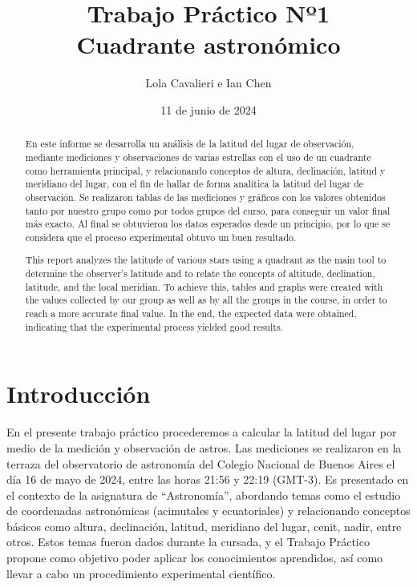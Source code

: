 \documentclass[12pt, a4paper]{article} %
\title{Trabajo Práctico Nº1 \\ Cuadrante astronómico}
\author{Lola Cavalieri e Ian Chen}
\date{11 de junio de 2024}
\begin{document}
\maketitle

\vspace{1cm}
\begin{abstract}
    En este informe se desarrolla un análisis de la latitud del lugar de observación, mediante mediciones y observaciones de varias estrellas con el uso de un cuadrante como herramienta principal, y relacionando conceptos de altura, declinación, latitud y meridiano del lugar, con el fin de hallar de forma analítica la latitud del lugar de observación. Se realizaron tablas de las mediciones y gráficos con los valores obtenidos tanto por nuestro grupo como por todos grupos del curso, para conseguir un valor final más exacto. Al final se obtuvieron los datos esperados desde un principio, por lo que se considera que el proceso experimental obtuvo un buen resultado.
\end{abstract}

\begin{abstract}
This report analyzes the latitude of various stars using a quadrant as the main tool to determine the observer's latitude and to relate the concepts of altitude, declination, latitude, and the local meridian. To achieve this, tables and graphs were created with the values collected by our group as well as by all the groups in the course, in order to reach a more accurate final value. In the end, the expected data were obtained, indicating that the experimental process yielded good results.
\end{abstract}

\newpage


\section{Introducción}
En el presente trabajo práctico procederemos a calcular la latitud del lugar por medio de la medición y observación de astros. 
Las mediciones se realizaron en la terraza del observatorio de astronomía del Colegio Nacional de Buenos Aires el día 16 de mayo de 2024, entre las horas 21:56 y 22:19 (GMT-3). 
Es presentado en el contexto de la asignatura de “Astronomía”, abordando temas como el estudio de coordenadas astronómicas (acimutales y ecuatoriales) y relacionando conceptos básicos como altura, declinación, latitud, meridiano del lugar, cenit, nadir, entre otros.
Estos temas fueron dados durante la cursada, y el Trabajo Práctico propone como objetivo poder aplicar los conocimientos aprendidos, así como llevar a cabo un procedimiento experimental científico.
\end{document}
